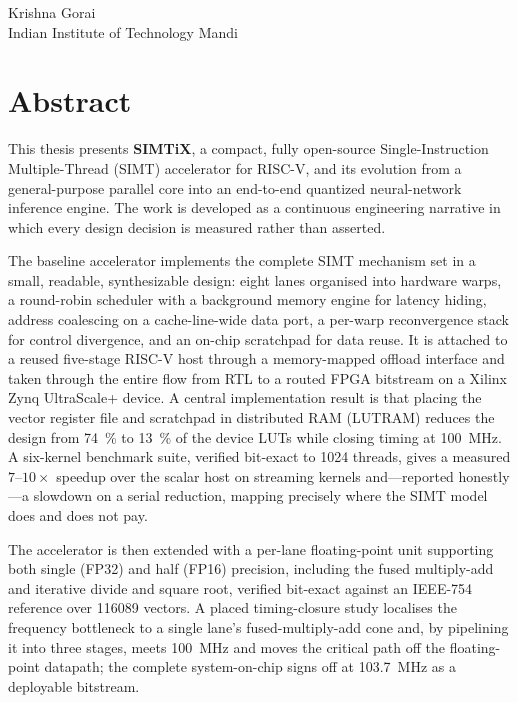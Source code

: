 \documentclass[12pt,a4paper,oneside]{report}
\begin{document}
\vspace{2.5cm}
\noindent Krishna Gorai\\
Indian Institute of Technology Mandi

\clearpage

\chapter*{Abstract}
\thispagestyle{plain}

This thesis presents \textbf{SIMTiX}, a compact, fully open-source
Single-Instruction Multiple-Thread (SIMT) accelerator for RISC-V, and its
evolution from a general-purpose parallel core into an end-to-end quantized
neural-network inference engine. The work is developed as a continuous
engineering narrative in which every design decision is measured rather than
asserted.

The baseline accelerator implements the complete SIMT mechanism set in a small,
readable, synthesizable design: eight lanes organised into hardware warps, a
round-robin scheduler with a background memory engine for latency hiding,
address coalescing on a cache-line-wide data port, a per-warp reconvergence
stack for control divergence, and an on-chip scratchpad for data reuse. It is
attached to a reused five-stage RISC-V host through a memory-mapped offload
interface and taken through the entire flow from RTL to a routed FPGA bitstream
on a Xilinx Zynq UltraScale+ device. A central implementation result is that
placing the vector register file and scratchpad in distributed RAM (LUTRAM)
reduces the design from \SI{74}{\percent} to \SI{13}{\percent} of the device
LUTs while closing timing at \SI{100}{\mega\hertz}. A six-kernel benchmark suite,
verified bit-exact to 1024 threads, gives a measured $7$--$10\times$ speedup over
the scalar host on streaming kernels and---reported honestly---a slowdown on a
serial reduction, mapping precisely where the SIMT model does and does not pay.

The accelerator is then extended with a per-lane floating-point unit supporting
both single (FP32) and half (FP16) precision, including the fused multiply-add
and iterative divide and square root, verified bit-exact against an IEEE-754
reference over \num{116089} vectors. A placed timing-closure study localises the
frequency bottleneck to a single lane's fused-multiply-add cone and, by
pipelining it into three stages, meets \SI{100}{\mega\hertz} and moves the
critical path off the floating-point datapath; the complete system-on-chip signs
off at \SI{103.7}{\mega\hertz} as a deployable bitstream.
\end{document}
